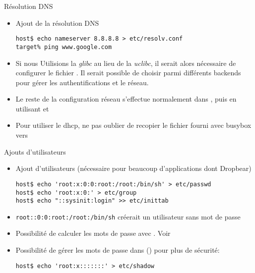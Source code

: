\begin{frame}[fragile=singleslide]{Résolution DNS}
  \begin{itemize}
  \item Ajout de la résolution DNS
    \begin{lstlisting}
host$ echo nameserver 8.8.8.8 > etc/resolv.conf
target% ping www.google.com
    \end{lstlisting}
  \item  Si nous Utilisions la  \emph{glibc}  au lieu  de  la \emph{uclibc},  il
    serait    alors    nécessaire    de    configurer    le    fichier
    .   Il  serait   possible  de   choisir  parmi
    différents  backends  pour  gérer  les  authentifications  et  le
    réseau.
  \item  Le reste  de la  configuration réseau  s'effectue normalement
    dans , puis en utilisant  et 
  \item Pour utiliser le dhcp, ne pas oublier de recopier le fichier 
     fourni avec busybox vers 
  \end{itemize}
\end{frame}

\begin{frame}[fragile=singleslide]{Ajouts d'utilisateurs}
  \begin{itemize}
  \item Ajout d'utilisateurs  (nécessaire pour beaucoup d'applications
    dont Dropbear)
    \begin{lstlisting}
host$ echo 'root:x:0:0:root:/root:/bin/sh' > etc/passwd
host$ echo 'root:x:0:' > etc/group
host$ echo "::sysinit:login" >> etc/inittab 
    \end{lstlisting}
  \item  \verb'root::0:0:root:/root:/bin/sh'  créerait un  utilisateur
    sans mot de passe
    \item Possibilité de calculer les mots de passe avec . Voir 
    \item Possibilité de gérer les mots de passe dans  () pour plus de sécurité:
    \begin{lstlisting}
host$ echo 'root:x:::::::' > etc/shadow
    \end{lstlisting}
  \end{itemize}
\end{frame}


